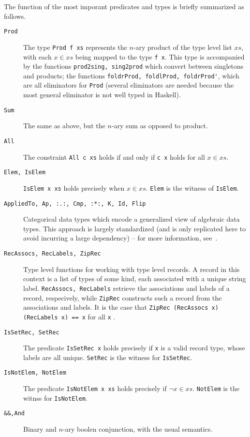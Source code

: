 \documentclass[12pt, svgnames]{article}
\begin{document}
The function of the most imporant 
predicates and types is briefly summarized as follows. 
\begin{description}
\item[\texttt{Prod}] The type \lstinline{Prod f xs} represents the $n$-ary product of the type
  level list $xs$, with each $x \in xs$ being mapped to the type \lstinline{f x}. This 
  type is accompanied by the functions \lstinline{prod2sing, sing2prod} which convert
  between singletons and products; the functions \lstinline{foldrProd, foldlProd, foldrProd'}, 
  which are all eliminators for \lstinline{Prod} (several eliminators are needed because the 
  most general eliminator is not well typed in Haskell). 
\item[\texttt{Sum}] The same as above, but the $n$-ary sum as opposed to product. 
\item[\texttt{All}] The constraint \lstinline{All c xs} holds if and only if \lstinline{c x} holds for all $x \in xs$. 
\item[\texttt{Elem, IsElem}] \lstinline{IsElem x xs} holds precisely when $x \in xs$. \lstinline{Elem} is the witness of \lstinline{IsElem}. 
\item[\texttt{AppliedTo, Ap, :.:, Cmp, :*:, K, Id, Flip}] Categorical data types which encode
a generalized view of algebraic data types. This approach is largely standardized (and is only
replicated here to avoid incurring a large dependency) -- for more information, see~\cite{alacarte}. 
\item[\texttt{RecAssocs, RecLabels, ZipRec}] Type level functions for working with type level records. 
A record in this context is a list of types of some kind, each associated with a unique string label. 
\lstinline{RecAssocs, RecLabels} retrieve the associations and labels of a record, respecively, 
while \lstinline{ZipRec} constructs such a record from the associations and labels. It is the case
that \lstinline{ZipRec (RecAssocs x) (RecLabels x) == x} for all \lstinline{x} .
\item[\texttt{IsSetRec, SetRec}] The predicate \lstinline{IsSetRec x} holds precisely if \lstinline{x}
  is a valid record type, whose labels are all unique. \lstinline{SetRec} is the witness for \lstinline{IsSetRec}. 
\item[\texttt{IsNotElem, NotElem}] The predicate \lstinline{IsNotElem x xs} holds precisely if $\lnot x \in xs$.
  \lstinline{NotElem} is the witnss for \lstinline{IsNotElem}. 
\item[\texttt{\&\&,And}] Binary and $n$-ary boolen conjunction, with the usual semantics. 
\end{description}
\end{document}

